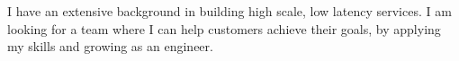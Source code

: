 
\begin{cvparagraph}
I have an extensive background in building high scale, low latency services. I am looking for a team where I can help customers achieve their goals, by applying my skills and growing as an engineer.
\end{cvparagraph}
